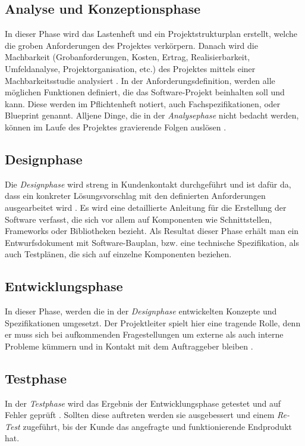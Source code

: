 \subsection{Analyse und Konzeptionsphase}
In dieser Phase wird das Lastenheft und ein Projektstrukturplan erstellt, welche die groben Anforderungen des Projektes verkörpern. Danach wird die Machbarkeit (Grobanforderungen, Kosten, Ertrag, Realisierbarkeit, Umfeldanalyse, Projektorganisation, etc.) des Projektes mittels einer Machbarkeitsstudie analysiert \cite{pm-wasserfall-ionos}. In der Anforderungsdefinition, werden alle möglichen Funktionen definiert, die das Software-Projekt beinhalten soll und kann. Diese werden im Pflichtenheft notiert, auch Fachspezifikationen, oder Blueprint genannt. Alljene Dinge, die in der \textit{Analysephase} nicht bedacht werden, können im Laufe des Projektes gravierende Folgen auslösen \cite{pm-wasserfall-online}.
\subsection{Designphase}
Die \textit{Designphase} wird streng in Kundenkontakt durchgeführt \cite{pm-wasserfall-online} und ist dafür da, dass ein konkreter Lösungsvorschlag mit den definierten Anforderungen ausgearbeitet wird \cite{pm-wasserfall-ionos}. Es wird eine detaillierte Anleitung für die Erstellung der Software verfasst, die sich vor allem auf Komponenten wie Schnittstellen, Frameworks oder Bibliotheken bezieht. Als Resultat dieser Phase erhält man ein Entwurfsdokument mit Software-Bauplan, bzw. eine technische Spezifikation, als auch Testplänen, die sich auf einzelne Komponenten beziehen.
\subsection{Entwicklungsphase}
In dieser Phase, werden die in der \textit{Designphase} entwickelten Konzepte und Spezifikationen umgesetzt. Der Projektleiter spielt hier eine tragende Rolle, denn er muss sich bei aufkommenden Fragestellungen um externe als auch interne Probleme kümmern und in Kontakt mit dem Auftraggeber bleiben \cite{pm-wasserfall-online}. 
\subsection{Testphase}
In der \textit{Testphase} wird das Ergebnis der Entwicklungsphase getestet und auf Fehler geprüft \cite{pm-wasserfall-online}. Sollten diese auftreten werden sie ausgebessert und einem \textit{Re-Test} zugeführt, bis der Kunde das angefragte und funktionierende Endprodukt hat.
